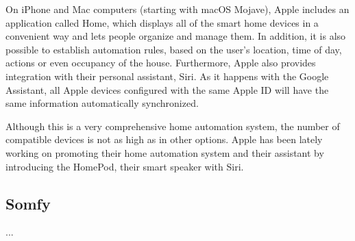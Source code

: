 On iPhone and Mac computers (starting with macOS Mojave), Apple includes an application called Home, which displays all 
of the smart home devices in a convenient way and lets people organize and manage them. In addition, it is also possible to establish 
automation rules, based on the user's location, time of day, actions or even occupancy of the house. Furthermore, Apple also provides
integration with their personal assistant, Siri. As it happens with the Google Assistant, all Apple devices configured with the same Apple 
ID will have the same information automatically synchronized.\cite{appleIOSHome}

Although this is a very comprehensive home automation system, the number of compatible devices is not as high as in other options. 
Apple has been lately working on promoting their home automation system and their assistant by introducing the HomePod, their smart
speaker with Siri.

\subsection{Somfy}
...


